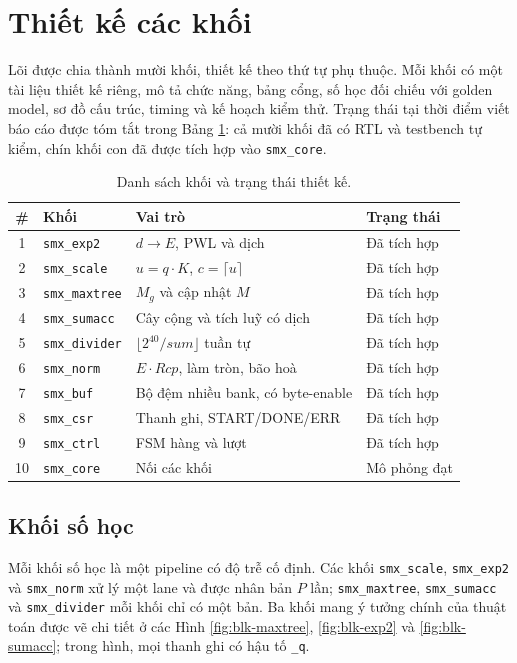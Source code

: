 \section{Thiết kế các khối}

Lõi được chia thành mười khối, thiết kế theo thứ tự phụ thuộc. Mỗi khối có một tài liệu thiết kế riêng, mô tả chức năng, bảng cổng, số học đối chiếu với golden model, sơ đồ cấu trúc, timing và kế hoạch kiểm thử. Trạng thái tại thời điểm viết báo cáo được tóm tắt trong Bảng \ref{tab:blocks}: cả mười khối đã có RTL và testbench tự kiểm, chín khối con đã được tích hợp vào \texttt{smx\_core}.

\begin{table}[htbp]
\centering
\begin{tabular}{clll}
\toprule
\# & Khối & Vai trò & Trạng thái \\
\midrule
1  & \texttt{smx\_exp2}    & $d \to E$, PWL và dịch & Đã tích hợp \\
2  & \texttt{smx\_scale}   & $u = q \cdot K$, $c = \lceil u \rceil$ & Đã tích hợp \\
3  & \texttt{smx\_maxtree} & $M_g$ và cập nhật $M$ & Đã tích hợp \\
4  & \texttt{smx\_sumacc}  & Cây cộng và tích luỹ có dịch & Đã tích hợp \\
5  & \texttt{smx\_divider} & $\lfloor 2^{40} / \mathit{sum} \rfloor$ tuần tự & Đã tích hợp \\
6  & \texttt{smx\_norm}    & $E \cdot \mathit{Rcp}$, làm tròn, bão hoà & Đã tích hợp \\
7  & \texttt{smx\_buf}     & Bộ đệm nhiều bank, có byte-enable & Đã tích hợp \\
8  & \texttt{smx\_csr}     & Thanh ghi, START/DONE/ERR & Đã tích hợp \\
9  & \texttt{smx\_ctrl}    & FSM hàng và lượt & Đã tích hợp \\
10 & \texttt{smx\_core}    & Nối các khối & Mô phỏng đạt \\
\bottomrule
\end{tabular}
\caption{Danh sách khối và trạng thái thiết kế.}
\label{tab:blocks}
\end{table}

\subsection{Khối số học}

Mỗi khối số học là một pipeline có độ trễ cố định. Các khối \texttt{smx\_scale}, \texttt{smx\_exp2} và \texttt{smx\_norm} xử lý một lane và được nhân bản $P$ lần; \texttt{smx\_maxtree}, \texttt{smx\_sumacc} và \texttt{smx\_divider} mỗi khối chỉ có một bản. Ba khối mang ý tưởng chính của thuật toán được vẽ chi tiết ở các Hình \ref{fig:blk-maxtree}, \ref{fig:blk-exp2} và \ref{fig:blk-sumacc}; trong hình, mọi thanh ghi có hậu tố \texttt{\_q}.

